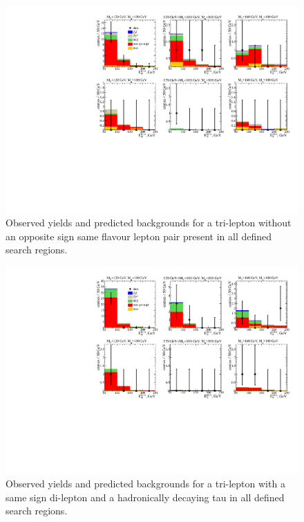 \begin{figure}[htp]
\begin{center}
\includegraphics[width=1.0\textwidth]{plots/ossf0tau0.pdf}
\caption{Observed yields and predicted backgrounds for a tri-lepton without an opposite sign same flavour lepton pair present in all defined search regions.}
\label{fig:OSSF0tau0}
\end{center}
\end{figure}

\begin{figure}[htp]
\begin{center}
\includegraphics[width=1.0\textwidth]{plots/ossf0tau1.pdf}
\caption{Observed yields and predicted backgrounds for a tri-lepton with a same sign di-lepton and a hadronically decaying tau in all defined search regions.}
\label{fig:SStau1}
\end{center}
\end{figure}

